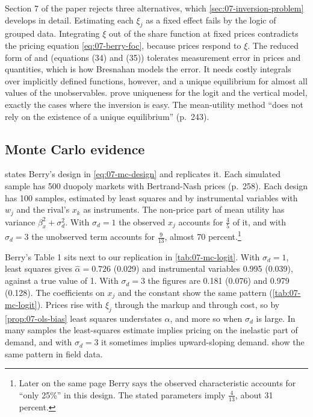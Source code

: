 Section 7 of the paper rejects three alternatives, which \cref{sec:07-inversion-problem} develops in detail.
Estimating each $\xi_j$ as a fixed effect fails by the logic of grouped data. Integrating $\xi$ out of the share
function at fixed prices contradicts the pricing equation \eqref{eq:07-berry-foc}, because prices respond to $\xi$.
The reduced form of \citet{Bresnahan1987} and \citet{Berry1990} (equations (34) and (35)) tolerates measurement error
in prices and quantities, which is how Bresnahan models the error. It needs costly integrals over implicitly defined
functions, however, and a unique equilibrium for almost all values of the unobservables. \citet{CaplinNalebuff1991}
prove uniqueness for the logit and the vertical model, exactly the cases where the inversion is easy. The
mean-utility method ``does not rely on the existence of a unique equilibrium'' (p.~243).

\subsection{Monte Carlo evidence}\label{sec:07-berry-mc}

 states Berry's design in \eqref{eq:07-mc-design} and replicates it. Each simulated
sample has 500 duopoly markets with Bertrand-Nash prices (p.~258). Each design has 100 samples, estimated by least
squares and by instrumental variables with $w_j$ and the rival's $x_k$ as instruments. The non-price part of mean
utility has variance $\beta_x^2 + \sigma_d^2$. With $\sigma_d = 1$ the observed $x_j$ accounts for $\frac{4}{5}$ of
it, and with $\sigma_d = 3$ the unobserved term accounts for $\frac{9}{13}$, almost 70 percent.\footnote{Later on
the same page Berry says the observed characteristic accounts for ``only 25\%'' in this design. The stated
parameters imply $\frac{4}{13}$, about 31 percent.}

Berry's Table 1 sits next to our replication in \cref{tab:07-mc-logit}. With $\sigma_d = 1$, least squares gives
$\hat\alpha = 0.726$ (0.029) and instrumental variables 0.995 (0.039), against a true value of 1. With
$\sigma_d = 3$ the figures are 0.181 (0.076) and 0.979 (0.128). The coefficients on $x_j$ and the constant show
the same pattern (\cref{tab:07-mc-logit}). Prices rise with $\xi_j$ through the markup and through cost, so by \cref{prop:07-ols-bias} least squares understates $\alpha$,
and more so when $\sigma_d$ is large. In many samples the least-squares estimate implies pricing on the inelastic
part of demand, and with $\sigma_d = 3$ it sometimes implies upward-sloping demand.  show the same pattern in field data.

